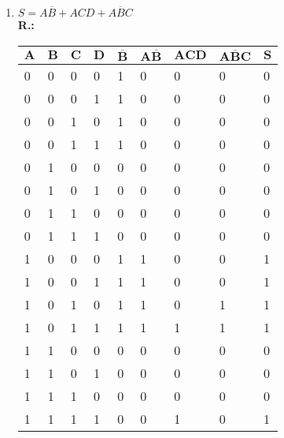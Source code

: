 \documentclass{article}[12pt]
\begin{document}
\begin{enumerate}
\begin{enumerate}
        \item $S = A\overline{B} + ACD + A\overline{B}C$ \\
        \textbf{R.:} 
        \begin{center}
            \begin{table}[h]
                \label{tab:2b}
                \begin{tabular}{|p{0.8cm}|p{0.8cm}|p{0.8cm}|p{0.8cm}|p{0.8cm}|p{0.8cm}|p{0.8cm}|p{0.8cm}|p{0.8cm}|}
                    \hline
                    \(\mathbf{A}\) & \(\mathbf{B}\) & \(\mathbf{C}\) & \(\mathbf{D}\) & \(\mathbf{\overline{B}}\) & \(\mathbf{A\overline{B}}\) & \(\mathbf{ACD}\) & \(\mathbf{A\overline{B}C}\) & \(\mathbf{S}\) \\ \hline
                    0 & 0 & 0 & 0 & 1 & 0 & 0 & 0 & 0 \\ \hline
                    0 & 0 & 0 & 1 & 1 & 0 & 0 & 0 & 0 \\ \hline
                    0 & 0 & 1 & 0 & 1 & 0 & 0 & 0 & 0 \\ \hline
                    0 & 0 & 1 & 1 & 1 & 0 & 0 & 0 & 0 \\ \hline
                    0 & 1 & 0 & 0 & 0 & 0 & 0 & 0 & 0 \\ \hline
                    0 & 1 & 0 & 1 & 0 & 0 & 0 & 0 & 0 \\ \hline
                    0 & 1 & 1 & 0 & 0 & 0 & 0 & 0 & 0 \\ \hline
                    0 & 1 & 1 & 1 & 0 & 0 & 0 & 0 & 0 \\ \hline
                    1 & 0 & 0 & 0 & 1 & 1 & 0 & 0 & 1 \\ \hline
                    1 & 0 & 0 & 1 & 1 & 1 & 0 & 0 & 1 \\ \hline
                    1 & 0 & 1 & 0 & 1 & 1 & 0 & 1 & 1 \\ \hline
                    1 & 0 & 1 & 1 & 1 & 1 & 1 & 1 & 1 \\ \hline
                    1 & 1 & 0 & 0 & 0 & 0 & 0 & 0 & 0 \\ \hline
                    1 & 1 & 0 & 1 & 0 & 0 & 0 & 0 & 0 \\ \hline
                    1 & 1 & 1 & 0 & 0 & 0 & 0 & 0 & 0 \\ \hline
                    1 & 1 & 1 & 1 & 0 & 0 & 1 & 0 & 1 \\ \hline
                \end{tabular}
            \end{table}
        \end{center}
    \end{enumerate}


\end{enumerate}
\end{document}
